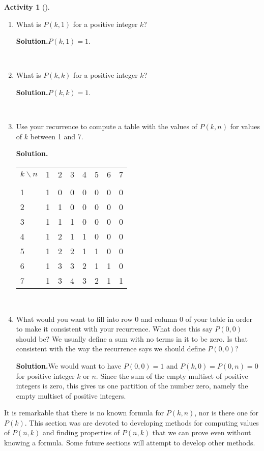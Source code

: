 \documentclass[10pt,]{book}
\theoremstyle{plain}
\theoremstyle{definition}
\newtheorem{activity}[project]{Activity}
\numberwithin{equation}{chapter}
\newcommand{\hrulethin}  {\noalign{\hrule height 0.04em}}
\begin{document}
\begin{activity}[]
\begin{enumerate}[label=(\alph*)]
~\par
\item What is \(P(k,1)\) for a positive integer \(k\)?%
\par\medskip\noindent%
\textbf{Solution.}\quad \(P(k,1)=1\).%

~\par
\item What is \(P(k,k)\) for a positive integer \(k\)?%
\par\medskip\noindent%
\textbf{Solution.}\quad \(P(k,k)=1\).%

~\par
\item Use your recurrence to compute a table with the values of \(P(k,n)\) for values of \(k\) between 1 and 7.%
\par\medskip\noindent%
\textbf{Solution.}\quad \begin{tabular}{llllllll}
\(k\backslash n\)&1&2&3&4&5&6&7\tabularnewline[0pt]
&&&&&&&\tabularnewline\hrulethin
1&1&0&0&0&0&0&0\tabularnewline[0pt]
2&1&1&0&0&0&0&0\tabularnewline[0pt]
3&1&1&1&0&0&0&0\tabularnewline[0pt]
4&1&2&1&1&0&0&0\tabularnewline[0pt]
5&1&2&2&1&1&0&0\tabularnewline[0pt]
6&1&3&3&2&1&1&0\tabularnewline[0pt]
7&1&3&4&3&2&1&1
\end{tabular}

~\par
\item What would you want to fill into row 0 and column 0 of your table in order to make it consistent with your recurrence.  What does this say \(P(0,0)\) should be?  We usually define a sum with no terms in it to be zero. Is that consistent with the way the recurrence says we should define \(P(0,0)\)?%
\par\medskip\noindent%
\textbf{Solution.}\quad We would want to have \(P(0,0)=1\) and \(P(k,0)=P(0,n)=0\) for positive integer \(k\) or \(n\). Since the sum of the empty multiset of positive integers is zero, this gives us one partition of the number zero, namely the empty multiset of positive integers.%

\end{enumerate}
\end{activity}
It is remarkable that there is no known formula for \(P(k,n)\), nor is there one for \(P(k)\). This section was are devoted to developing methods for computing values of \(P(n,k)\) and finding properties of \(P(n,k)\) that we can prove even without knowing a formula. Some future sections will attempt to develop other methods.%
\par
\end{document}
